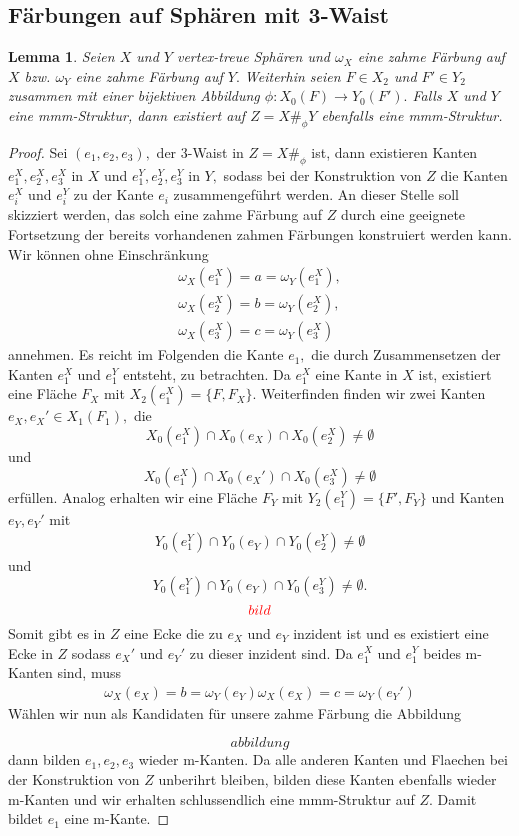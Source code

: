 \documentclass[12pt,titlepage,twoside,cleardoublepage]{article}
\theoremstyle{nummermitklammern}
\newtheorem{lemma}[temp]{Lemma}
\newtheorem{lemma}[zahl]{Lemma}
\numberwithin{equation}{section}
\begin{document}
\subsection{Färbungen auf Sphären mit 3-Waist}
\begin{lemma}
Seien $X$ und $Y$ vertex-treue Sphären und $\omega_X$ eine zahme Färbung auf $X$ bzw. $\omega_Y$ eine zahme Färbung auf $Y.$ Weiterhin seien $F\in X_2$ und $F'\in Y_2$ zusammen mit einer bijektiven Abbildung $\phi:X_0(F)\to Y_0(F').$
Falls $X$ und $Y$ eine mmm-Struktur, dann existiert auf $Z=X\#_{\phi}Y$ ebenfalls eine mmm-Struktur.
\end{lemma}
\begin{proof}
 Sei  $(e_1,e_2,e_3),$ der 3-Waist in $Z=X\#_{\phi}$ ist, dann existieren Kanten $e^X_1,e^X_2,e_3^X$ in $X$ und $e^Y_1,e^Y_2,e_3^Y$ in $Y,$ sodass bei der Konstruktion von $Z$ die Kanten $e_i^X$ und $e_i^Y$ zu der Kante $e_i$ zusammengeführt werden. An dieser Stelle soll skizziert werden, das solch eine zahme Färbung auf $Z$ durch eine geeignete Fortsetzung der bereits vorhandenen zahmen Färbungen konstruiert werden kann.  
Wir können ohne Einschränkung 
\begin{align*}
\omega_X(e_1^X)=a=\omega_Y(e_1^X),\\
 \omega_X(e_2^X)=b=\omega_Y(e_2^X),\\
 \omega_X(e_3^X)=c=\omega_Y(e_3^X)
\end{align*}
annehmen. Es reicht im Folgenden die Kante $e_1,$ die durch Zusammensetzen der Kanten $e_1^X$ und $e_1^Y$ entsteht, zu betrachten. Da $e_1^X$ eine Kante in $X$ ist, existiert eine Fläche $F_X$ mit $X_2(e_1^X)=\{F,F_X\}$. Weiterfinden finden wir zwei Kanten $e_X,e_X'\in X_1(F_1), $ die 
\[
X_0(e_1^X)\cap X_0(e_X) \cap X_0(e_2^X)\neq \emptyset
\]
und 
\[
X_0(e_1^X)\cap X_0(e_X') \cap X_0(e_3^X)\neq \emptyset
\]
erfüllen. Analog erhalten wir eine Fläche $F_Y$ mit $Y_2(e_1^Y)=\{F',F_Y\}$ und Kanten $e_Y,e_Y'$ mit 
\begin{align*}
Y_0(e_1^Y)\cap Y_0(e_Y) \cap Y_0(e_2^Y)\neq \emptyset
\end{align*}
und 
\[
Y_0(e_1^Y)\cap Y_0(e_Y) \cap Y_0(e_3^Y)\neq \emptyset.
\]
\[
\textcolor{red}{bild}
\]
Somit gibt es in $Z$ eine Ecke die zu $e_X$ und $e_Y$ inzident ist und es existiert eine Ecke in $Z$ sodass  $e_X'$ und $e_Y'$ zu dieser inzident sind.
Da $e_1^X$ und $e_1^Y$ beides m-Kanten sind, muss 
\begin{align*}
\omega_X(e_X)=b=\omega_Y(e_Y)
\omega_X(e_X)=c=\omega_Y(e_Y')
\end{align*}
Wählen wir nun als Kandidaten für unsere zahme Färbung die Abbildung

\[
abbildung 
\] 
dann bilden $e_1,e_2,e_3$ wieder m-Kanten. Da alle anderen Kanten und Flaechen bei der Konstruktion von $Z$ unberihrt bleiben, bilden diese Kanten ebenfalls wieder m-Kanten und wir erhalten schlussendlich eine mmm-Struktur auf $Z.$  
Damit bildet $e_1$ eine m-Kante. 
\end{proof}
\end{document}
